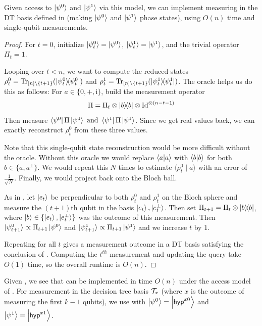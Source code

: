 \begin{lemma}\label{lem:computational efficiency}
    Given access to $\ket{\smash{\psi^{ 0}}}$ and $\ket{\smash{\psi^{ 1}}}$ via this model, we can implement measuring in the DT basis defined in  (making $\ket{\smash{\psi^0}}$ and $\ket{\smash{\psi^1}}$ phase states), using $O(n)$ time and single-qubit measurements.
\end{lemma}
\begin{proof}
  For $t=0$, initialize $\ket{\smash{\psi^0_t}}=\ket{\smash{\psi^0}}$, $\ket{\smash{\psi^1_t}}=\ket{\smash{\psi^1}}$, and the trivial operator $\Pi_t=1$.

  Looping over $t<n$, we want to compute the reduced states $\rho^0_t = \Tr_{[n]\setminus \{t+1\}}(\ketbra{\smash{\psi^0_t}}{\smash{\psi^0_t}})$ and $\rho^1_t = \Tr_{[n]\setminus \{t+1\}}(\ketbra{\smash{\psi^1_t}}{\smash{\psi^1_t}})$. The oracle helps us do this as follows: For $a\in\{0,+,\mathfrak{i}\}$, build the measurement operator
\[
  \Pi = \Pi_t \otimes \ketbra{b}{b} \otimes \mathrm{Id}^{\otimes (n - t - 1)}
\]
  Then measure $\bra{\smash{\psi^0}}\Pi\ket{\smash{\psi^0}}\text{ and }\bra{\smash{\psi^1}}\Pi\ket{\smash{\psi^1}}$. Since we get real values back, we can exactly reconstruct $\rho^0_t$ from these three values.

  Note that this single-qubit state reconstruction would be more difficult without the oracle. Without this oracle we would replace $\bra{a} \ket{a}$ with $\bra{b} \ket{b}$ for both $b \in \{a, a^{\bot}\}$. We would repeat this $N$ times to estimate $\langle \rho_t^0 \mid a\rangle$ with an error of $\frac 1 {\sqrt N}$. Finally, we would project back onto the Bloch ball.
    
    As in , let $\ket{e_t}$ be perpendicular to both $\rho^0_t$ and $\rho^1_t$ on the Bloch sphere and measure the $(t+1)$th qubit in the basis $\ket{e_t},\ket{\smash{e_t^\perp}}$. Then set $\Pi_{t+1}=\Pi_t \otimes\ketbra{b}{b}$, where $\ket{b}\in \{\ket{e_t},\ket{\smash{e^\perp_t}}\}$ was the outcome of this measurement. Then $\ket{\smash{\psi^0_{t+1}}}\propto\Pi_{t+1}\ket{\smash{\psi^0}}$ and $\ket{\smash{\psi^1_{t+1}}}\propto\Pi_{t+1}\ket{\smash{\psi^1}}$ and we increase $t$ by $1$.

    Repeating for all $t$ gives a measurement outcome in a DT basis satisfying the conclusion of . Computing the $t^{th}$ measurement and updating the query take $O(1)$ time, so the overall runtime is $O(n)$.

\end{proof}
Given , we see that  can be implemented in time $O(n)$ under the access model of . For measurement in the decision tree basis $\mathcal{T}_x$ (where $x$ is the outcome of measuring the first $k-1$ qubits), we use  with $\ket{\psi^0}=\ket{\mathsf{hyp}^{x0}}$ and $\ket{\psi^1}=\ket{\mathsf{hyp}^{x1}}$.
